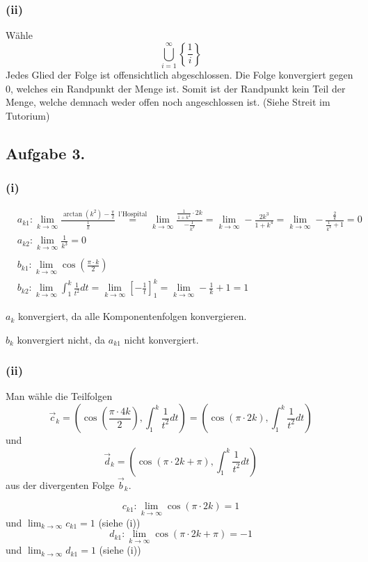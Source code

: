 \documentclass[10pt,a4paper]{scrartcl}
\begin{document}
\subsubsection*{\textbf{(ii)}}
Wähle $$\bigcup_{i = 1}^{\infty} \left\{\frac{1}{i}\right\}$$ Jedes Glied der Folge ist offensichtlich abgeschlossen. Die Folge konvergiert gegen $0$, welches ein Randpunkt der Menge ist. Somit ist der Randpunkt kein Teil der Menge, welche demnach weder offen noch angeschlossen ist. (Siehe Streit im Tutorium)
\subsection*{Aufgabe 3.}
\subsubsection*{\textbf{(i)}}
\begin{align*}
&a_{k1}: \lim_{k \to \infty} \frac{ \arctan \left( k^2 \right) - \frac{\pi}2}{\frac 1k} \overset{\text{l'Hospital}}{=} \lim_{k \to \infty} \frac{\frac{1}{1+ k^4} \cdot 2k}{- \frac{1}{k^2}} = \lim_{k \to \infty} - \frac{2k^3}{1+k^4} = \lim_{k \to \infty} - \frac{\frac 2k}{\frac 1{k^4} + 1} = 0\\
&a_{k2}: \lim_{k \to \infty} \frac 1{k^3} = 0\\
\\
&b_{k1}: \lim_{k \to \infty} \cos \left( \frac{\pi \cdot k}{2} \right)\\
&b_{k2}: \lim_{k \to \infty} \int_1^k \frac 1{t^2} dt = \lim_{k \to \infty} \left[ - \frac 1t \right]_1^k = \lim_{k \to \infty} -\frac 1k + 1 = 1 
\end{align*}

$a_k$ konvergiert, da alle Komponentenfolgen konvergieren.

$b_k$ konvergiert nicht, da $a_{k1}$ nicht konvergiert.
\subsubsection*{\textbf{(ii)}}
Man wähle die Teilfolgen $$\vec c_k = \left(\cos \left( \frac{\pi \cdot 4k}{2} \right), \int_1^k \frac 1{t^2} dt\right) = \left(\cos \left(\pi \cdot 2k \right), \int_1^k \frac 1{t^2} dt\right) $$ und $$\vec d_k = \left(\cos \left(\pi \cdot 2k + \pi\right), \int_1^k \frac 1{t^2} dt\right)$$
aus der divergenten Folge $\vec b_k$.

$$c_{k1}: \lim_{k \to \infty} \cos \left(\pi \cdot 2k \right) = 1$$
und $ \lim_{k \to \infty} c_{k1} = 1$ (siehe (i))
$$d_{k1}: \lim_{k \to \infty} \cos \left(\pi \cdot 2k + \pi\right) = -1$$
und $ \lim_{k \to \infty} d_{k1} = 1$ (siehe (i))
\end{document}
